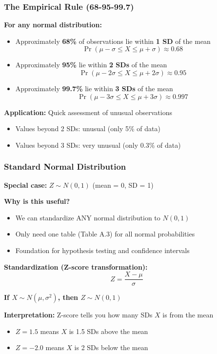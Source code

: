 \documentclass{beamer}
\begin{document}
\begin{frame}
\frametitle{The Empirical Rule (68-95-99.7)}
\textbf{For any normal distribution:}

\vspace{0.5cm}
\begin{itemize}
\item Approximately \textbf{68\%} of observations lie within \textbf{1 SD} of the mean
  $$\Pr(\mu - \sigma \leq X \leq \mu + \sigma) \approx 0.68$$

\item Approximately \textbf{95\%} lie within \textbf{2 SDs} of the mean
  $$\Pr(\mu - 2\sigma \leq X \leq \mu + 2\sigma) \approx 0.95$$

\item Approximately \textbf{99.7\%} lie within \textbf{3 SDs} of the mean
  $$\Pr(\mu - 3\sigma \leq X \leq \mu + 3\sigma) \approx 0.997$$
\end{itemize}

\vspace{0.3cm}
\textbf{Application:} Quick assessment of unusual observations
\begin{itemize}
\item Values beyond 2 SDs: unusual (only 5\% of data)
\item Values beyond 3 SDs: very unusual (only 0.3\% of data)
\end{itemize}
\end{frame}

\begin{frame}
\frametitle{Standard Normal Distribution}
\textbf{Special case:} $Z \sim N(0, 1)$ (mean = 0, SD = 1)

\vspace{0.3cm}
\textbf{Why is this useful?}
\begin{itemize}
\item We can standardize ANY normal distribution to $N(0,1)$
\item Only need one table (Table A.3) for all normal probabilities
\item Foundation for hypothesis testing and confidence intervals
\end{itemize}

\vspace{0.5cm}
\textbf{Standardization (Z-score transformation):}
$$Z = \frac{X - \mu}{\sigma}$$

\textbf{If $X \sim N(\mu, \sigma^2)$, then $Z \sim N(0, 1)$}

\vspace{0.3cm}
\textbf{Interpretation:} Z-score tells you how many SDs $X$ is from the mean
\begin{itemize}
\item $Z = 1.5$ means $X$ is 1.5 SDs above the mean
\item $Z = -2.0$ means $X$ is 2 SDs below the mean
\end{itemize}
\end{frame}
\end{document}
